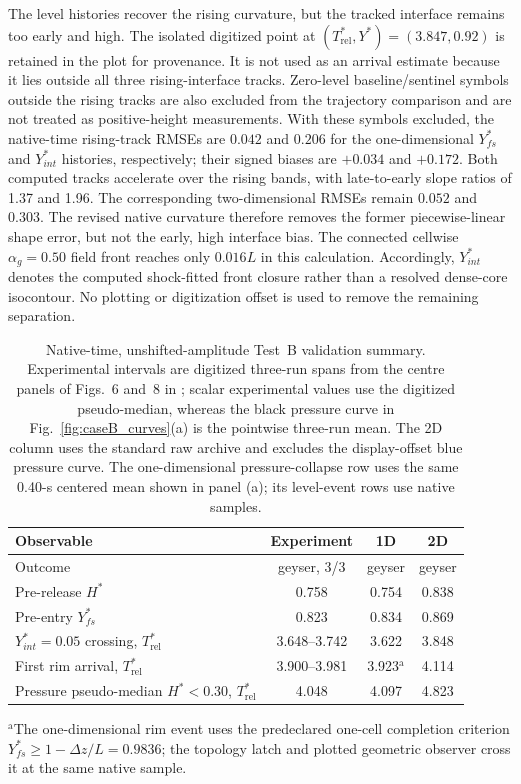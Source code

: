 The level histories recover the rising curvature, but the tracked interface
remains too early and high. The isolated digitized point at
$(T_{\mathrm{rel}}^{*},Y^{*})=(3.847,0.92)$ is retained in the plot for
provenance. It is not used as an arrival estimate because it lies
outside all three rising-interface tracks. Zero-level baseline/sentinel symbols
outside the rising tracks are also excluded from the trajectory comparison and
are not treated as positive-height measurements. With these symbols excluded,
the native-time rising-track RMSEs are $0.042$ and $0.206$ for the
one-dimensional $Y^{*}_{fs}$ and $Y^{*}_{int}$ histories, respectively; their
signed biases are $+0.034$ and $+0.172$. Both computed tracks accelerate over
the rising bands, with late-to-early slope ratios of 1.37 and 1.96. The
corresponding two-dimensional RMSEs remain $0.052$ and $0.303$. The revised
native curvature therefore removes the former piecewise-linear shape error,
but not the early, high interface bias. The connected cellwise
$\alpha_g=0.50$ field front reaches only $0.016L$ in this calculation.
Accordingly, $Y^{*}_{int}$ denotes the computed shock-fitted front closure
rather than a resolved dense-core isocontour. No plotting or digitization
offset is used to remove the remaining separation.

\FloatBarrier

\begin{table}[htbp]
\centering
\caption{Native-time, unshifted-amplitude Test~B validation summary.
Experimental intervals are
digitized three-run spans from the centre panels of Figs.~6 and~8 in
\cite{vasconcelos2011}; scalar experimental values use the digitized
pseudo-median, whereas the black pressure curve in
Fig.~\ref{fig:caseB_curves}(a) is the pointwise three-run mean. The 2D column
uses the standard raw archive and excludes the display-offset blue pressure
curve. The one-dimensional pressure-collapse row uses the same 0.40-s
centered mean shown in panel (a); its level-event rows use native samples.}
\label{tab:caseB_summary}
\begin{tabular}{lccc}
\toprule
Observable & Experiment & 1D & 2D \\
\midrule
Outcome & geyser, 3/3 & geyser & geyser \\
Pre-release $H^{*}$ & 0.758 & 0.754 & 0.838 \\
Pre-entry $Y^{*}_{fs}$ & 0.823 & 0.834 & 0.869 \\
$Y^{*}_{int}=0.05$ crossing, $T_{\mathrm{rel}}^{*}$ & 3.648--3.742 & 3.622 & 3.848 \\
First rim arrival, $T_{\mathrm{rel}}^{*}$ & 3.900--3.981 & 3.923$^{\mathrm{a}}$ & 4.114 \\
Pressure pseudo-median $H^{*}<0.30$, $T_{\mathrm{rel}}^{*}$ & 4.048 & 4.097 & 4.823 \\
\bottomrule
\end{tabular}
\vspace{0.3em}

\parbox{0.98\linewidth}{\footnotesize $^{\mathrm{a}}$The one-dimensional
rim event uses the predeclared one-cell completion criterion
$Y^{*}_{fs}\ge 1-\Delta z/L=0.9836$; the topology latch and plotted
geometric observer cross it at the same native sample.}
\end{table}

